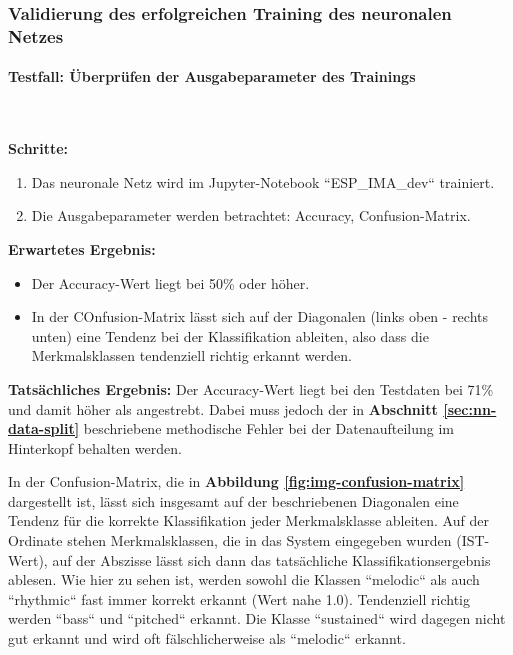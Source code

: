 %
%
%
%

\subsubsection{Validierung des erfolgreichen Training des neuronalen Netzes}
\label{sec:nn-validation}

\paragraph{Testfall: Überprüfen der Ausgabeparameter des Trainings}\mbox{}\\
\begin{adjustwidth}{0.5cm}{0cm}
\textbf{Schritte:}
\begin{enumerate}
	\item Das neuronale Netz wird im Jupyter-Notebook ``ESP\_IMA\_dev`` trainiert.
	\item Die Ausgabeparameter werden betrachtet: Accuracy, Confusion-Matrix.
\end{enumerate}

\textbf{Erwartetes Ergebnis:} 
\begin{itemize}
	\item Der Accuracy-Wert liegt bei 50\% oder höher.
	\item In der COnfusion-Matrix lässt sich auf der Diagonalen (links oben - rechts unten) eine Tendenz bei der Klassifikation ableiten, also dass die Merkmalsklassen tendenziell richtig erkannt werden.
\end{itemize}
\textbf{Tatsächliches Ergebnis:}
Der Accuracy-Wert liegt bei den Testdaten bei 71\% und damit höher als angestrebt. Dabei muss jedoch der in \textbf{Abschnitt \ref{sec:nn-data-split}} beschriebene methodische Fehler bei der Datenaufteilung im Hinterkopf behalten werden.

In der Confusion-Matrix, die in \textbf{Abbildung \ref{fig:img-confusion-matrix}} dargestellt ist, lässt sich insgesamt auf der beschriebenen Diagonalen eine Tendenz für die korrekte Klassifikation jeder Merkmalsklasse ableiten. Auf der Ordinate stehen Merkmalsklassen, die in das System eingegeben wurden (IST-Wert), auf der Abszisse lässt sich dann das tatsächliche Klassifikationsergebnis ablesen. Wie hier zu sehen ist, werden sowohl die Klassen ``melodic`` als auch ``rhythmic`` fast immer korrekt erkannt (Wert nahe 1.0). Tendenziell richtig werden ``bass`` und ``pitched`` erkannt. Die Klasse ``sustained`` wird dagegen nicht gut erkannt und wird oft fälschlicherweise als ``melodic`` erkannt.


\end{adjustwidth}
